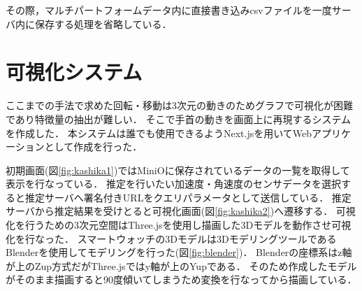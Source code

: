 その際，マルチパートフォームデータ内に直接書き込みcsvファイルを一度サーバ内に保存する処理を省略している．

\section{可視化システム}
ここまでの手法で求めた回転・移動は3次元の動きのためグラフで可視化が困難であり特徴量の抽出が難しい．
そこで手首の動きを画面上に再現するシステムを作成した．
本システムは誰でも使用できるようNext.jsを用いてWebアプリケーションとして作成を行った．

初期画面(図\ref{fig:kashika1})ではMiniOに保存されているデータの一覧を取得して表示を行なっている．
推定を行いたい加速度・角速度のセンサデータを選択すると推定サーバへ署名付きURLをクエリパラメータとして送信している．
推定サーバから推定結果を受けとると可視化画面(図\ref{fig:kashika2})へ遷移する．
可視化を行うための3次元空間はThree.jsを使用し描画した3Dモデルを動作させ可視化を行なった．
スマートウォッチの3Dモデルは3DモデリングツールであるBlenderを使用してモデリングを行った(図\ref{fig:blender})．
Blenderの座標系はz軸が上のZup方式だがThree.jsではy軸が上のYupである．
そのため作成したモデルがそのまま描画すると90度傾いてしまうため変換を行なってから描画している．

